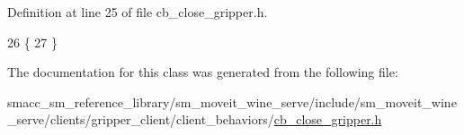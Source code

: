 Definition at line 25 of file cb\+\_\+close\+\_\+gripper.\+h.


\begin{DoxyCode}
26     \{
27     \}
\end{DoxyCode}


The documentation for this class was generated from the following file\+:\begin{DoxyCompactItemize}
\item 
smacc\+\_\+sm\+\_\+reference\+\_\+library/sm\+\_\+moveit\+\_\+wine\+\_\+serve/include/sm\+\_\+moveit\+\_\+wine\+\_\+serve/clients/gripper\+\_\+client/client\+\_\+behaviors/\hyperlink{sm__moveit__wine__serve_2include_2sm__moveit__wine__serve_2clients_2gripper__client_2client__behaviors_2cb__close__gripper_8h}{cb\+\_\+close\+\_\+gripper.\+h}\end{DoxyCompactItemize}
